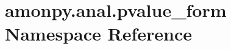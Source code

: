 \hypertarget{namespaceamonpy_1_1anal_1_1pvalue__form}{\section{amonpy.\-anal.\-pvalue\-\_\-form Namespace Reference}
\label{namespaceamonpy_1_1anal_1_1pvalue__form}
}
